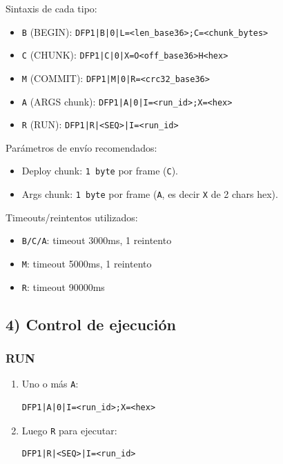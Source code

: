 Sintaxis de cada tipo:
\begin{itemize}
    \item \texttt{B} (BEGIN): \texttt{DFP1|B|0|L=<len\_base36>;C=<chunk\_bytes>}
    \item \texttt{C} (CHUNK): \texttt{DFP1|C|0|X=O<off\_base36>H<hex>}
    \item \texttt{M} (COMMIT): \texttt{DFP1|M|0|R=<crc32\_base36>}
    \item \texttt{A} (ARGS chunk): \texttt{DFP1|A|0|I=<run\_id>;X=<hex>}
    \item \texttt{R} (RUN): \texttt{DFP1|R|<SEQ>|I=<run\_id>}
\end{itemize}

Parámetros de envío recomendados:
\begin{itemize}
    \item Deploy chunk: \texttt{1 byte} por frame (\texttt{C}).
    \item Args chunk: \texttt{1 byte} por frame (\texttt{A}, es decir \texttt{X} de 2 chars hex).
\end{itemize}

Timeouts/reintentos utilizados:
\begin{itemize}
    \item \texttt{B/C/A}: timeout 3000ms, 1 reintento
    \item \texttt{M}: timeout 5000ms, 1 reintento
    \item \texttt{R}: timeout 90000ms
\end{itemize}

\subsection*{4) Control de ejecución}

\subsubsection*{RUN}
\begin{enumerate}
    \item Uno o más \texttt{A}:
          \begin{verbatim}
DFP1|A|0|I=<run_id>;X=<hex>
\end{verbatim}
    \item Luego \texttt{R} para ejecutar:
          \begin{verbatim}
DFP1|R|<SEQ>|I=<run_id>
\end{verbatim}
\end{enumerate}

